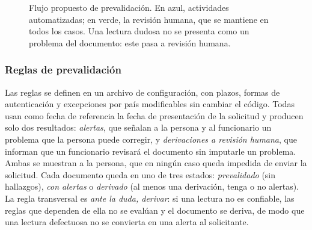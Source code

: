 \documentclass[11pt,a4paper]{article}
\begin{document}
\begin{figure}[!htbp]
{}
\caption{Flujo propuesto de prevalidación. En azul, actividades automatizadas; en verde, la revisión humana, que se mantiene en todos los casos. Una lectura dudosa no se presenta como un problema del documento: este pasa a revisión humana.}
\label{fig:propuesto}
\end{figure}

\subsubsection{Reglas de prevalidación}
\label{sec:reglas}
Las reglas se definen en un archivo de configuración, con plazos, formas de autenticación y excepciones por país modificables sin cambiar el código. Todas usan como fecha de referencia la fecha de presentación de la solicitud y producen solo dos resultados: \emph{alertas}, que señalan a la persona y al funcionario un problema que la persona puede corregir, y \emph{derivaciones a revisión humana}, que informan que un funcionario revisará el documento sin imputarle un problema. Ambas se muestran a la persona, que en ningún caso queda impedida de enviar la solicitud. Cada documento queda en uno de tres estados: \emph{prevalidado} (sin hallazgos), \emph{con alertas} o \emph{derivado} (al menos una derivación, tenga o no alertas). La regla transversal es \emph{ante la duda, derivar}: si una lectura no es confiable, las reglas que dependen de ella no se evalúan y el documento se deriva, de modo que una lectura defectuosa no se convierta en una alerta al solicitante.
\end{document}
